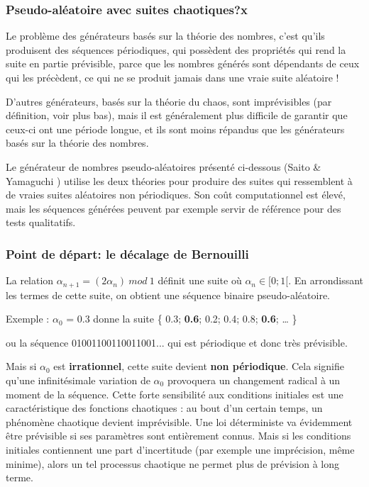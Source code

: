 \documentclass{scrartcl}
\begin{document}
\subsubsection{Pseudo-aléatoire avec suites chaotiques?x}
Le problème des générateurs basés sur la théorie des nombres, c’est qu’ils
produisent des séquences périodiques, qui possèdent des propriétés qui rend la
suite en partie prévisible, parce que les nombres générés sont dépendants de
ceux qui les précèdent, ce qui ne se produit jamais dans une vraie suite
aléatoire ! \par
D’autres générateurs, basés sur la théorie du chaos, sont imprévisibles (par
définition, voir plus bas), mais il est généralement plus difficile de garantir
que ceux-ci ont une période longue, et ils sont moins répandus que les
générateurs basés sur la théorie des nombres. \par
Le générateur de nombres pseudo-aléatoires présenté ci-dessous (Saito \&
Yamaguchi \cite{SY}) utilise les deux théories pour produire des suites qui
ressemblent à de vraies suites aléatoires non périodiques. Son coût
computationnel est élevé, mais les séquences générées peuvent par exemple servir
de référence pour des tests qualitatifs.

\subsubsection{Point de départ: le décalage de Bernouilli}
La relation $\alpha_{n+1}=(2\alpha_n)\ mod\ 1$ définit une suite où
$\alpha_n \in [0;1[$. En arrondissant les termes de cette suite, on obtient une
séquence binaire pseudo-aléatoire. \par
Exemple : $\alpha_0$ = 0.3 donne la suite \{ 0.3; \textbf{0.6}; 0.2; 0.4; 0.8;
\textbf{0.6}; … \} \par
ou la séquence 01001100110011001... qui est périodique et donc très
prévisible. \par
Mais si $\alpha_0$ est \textbf{irrationnel}, cette suite devient \textbf{non
  périodique}. Cela signifie qu’une infinitésimale variation de $\alpha_0$
provoquera un changement radical à un moment de la séquence. Cette forte
sensibilité aux conditions initiales est une caractéristique des fonctions
chaotiques : au bout d'un certain temps, un phénomène chaotique devient
imprévisible.  Une loi déterministe va évidemment être prévisible si ses
paramètres sont entièrement connus. Mais si les conditions initiales contiennent
une part d’incertitude (par exemple une imprécision, même minime), alors un tel
processus chaotique ne permet plus de prévision à long terme.
\end{document}
